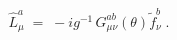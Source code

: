 \begin{equation}\label{eq:ltheta}
{\hat L}^a_\mu \;=\; - i g^{-1} \, G_{\mu\nu}^{ab}(\theta) {\tilde f}_\nu^b\;.
\end{equation}

